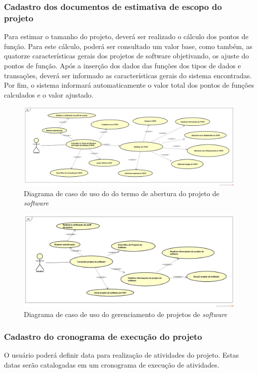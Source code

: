 \documentclass{acm_proc_article-sp}
\begin{document}
\subsubsection{Cadastro dos documentos de estimativa de escopo do projeto}
Para estimar o tamanho do projeto, deverá ser realizado o cálculo dos pontos de função. Para este cálculo, poderá ser consultado um valor base, como também, as quatorze características gerais dos projetos de software objetivando, os ajuste do pontos de função. Após a inserção dos dados das funções dos tipos de dados e transações, deverá ser informado as características gerais do sistema encontradas. Por fim, o sistema informará automaticamente o valor total dos pontos de funções calculados e o valor ajustado.

\begin{figure}[h]
\centering %
\includegraphics[width=1\textwidth]{TAP.png} %
\caption{Diagrama de caso de uso do do termo de abertura do projeto de \textit{software}}
\end{figure}

\begin{figure}[h]
\centering %
\includegraphics[width=1\textwidth]{Consulta_de_Projeto.png} %
\caption{Diagrama de caso de uso do gerenciamento de projetos de \textit{software}}
\end{figure}

\subsubsection{Cadastro do cronograma de execução do projeto}
O usuário poderá definir data para realização de atividades do projeto. Estas datas serão catalogadas em um cronograma de execução de atividades.
\end{document}
